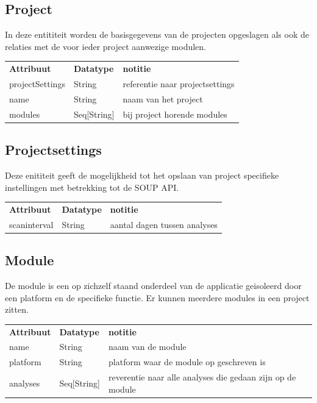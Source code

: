 \subsection{Project}\label{subsec:project}
In deze entititeit worden de basisgegevens van de projecten opgeslagen als ook de relaties met de voor ieder project aanwezige modulen.

\begin{tabular}{lll}
    \textbf{Attribuut} & \textbf{Datatype} & \textbf{notitie}\\
    projectSettings & String & referentie naar projectsettings\\
    name & String & naam van het project\\
    modules & Seq[String] & bij project horende modules\\

\end{tabular}
\subsection{Projectsettings}\label{subsec:projectsettings}
Deze enititeit geeft de mogelijkheid tot het opslaan van project specifieke instellingen met betrekking tot de SOUP API.

\begin{tabular}{lll}
    \textbf{Attribuut} & \textbf{Datatype} & \textbf{notitie}\\
    scaninterval  & String & aantal dagen tussen analyses\\
\end{tabular}

\subsection{Module}\label{subsec:module}
De module is een op zichzelf staand onderdeel van de applicatie geisoleerd door een platform en de specifieke functie. Er kunnen meerdere modules in een project zitten.

\begin{tabular}{lll}
    \textbf{Attribuut} & \textbf{Datatype} & \textbf{notitie}\\
    name  & String & naam van de module\\
    platform  & String & platform waar de module op geschreven is \\
    analyses  & Seq[String] & reverentie naar alle analyses die gedaan zijn op de module\\
\end{tabular}


